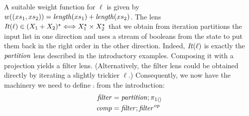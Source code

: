 \begin{defn}[$R$-similarity]
\begin{theorem}
\begin{lemma}
\begin{theorem}[No products]
\begin{lemma}
\begin{defn}
\begin{theorem}
A suitable weight function for $\ell$ is 
given by 
$w((xs_1,xs_2))=\mathit{length}(xs_1)+\mathit{length}(xs_2)$.
%
The lens $\mathit{It}(\ell) \in (X_1+X_2)^\star \Longleftrightarrow X_1^\star \times X_2^\star$ that
we obtain from iteration partitions the input list in one direction and uses
a stream of booleans from the state to put them back in the right order in
the other direction. Indeed, $\mathit{It}(\ell)$ is exactly the $\mathit{partition}$ lens
described in the introductory examples. Composing it with a projection
yields a filter lens. (Alternatively, the filter lens could be obtained
directly by iterating a slightly trickier $\ell$.) Consequently, we now have
the machinery we need to define $\comp$ from the introduction:
\begin{align*}
    \mathit{filter} &= \mathit{partition};\pi_{1\left<\right>} \\
    \mathit{comp}   &= \mathit{filter};\mathit{filter}^\mathit{op}
\end{align*}

\iflater
\item {}
\fi



\end{theorem}
\end{defn}
\end{lemma}
\end{theorem}
\end{lemma}
\end{theorem}
\end{defn}
